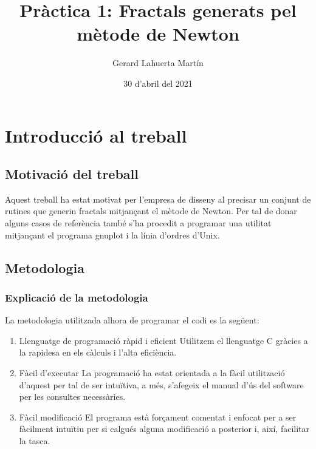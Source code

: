 \documentclass[12pt]{report}
\title{Pràctica 1: Fractals generats pel mètode de Newton}
\author{Gerard Lahuerta Martín}
\date{ 30 d'abril del 2021}
\begin{document}
\justifying
\maketitle


\newpage
\setcounter{page}{2}
\pagestyle{plain}
\tableofcontents
\cleardoublepage
{}


\newpage
\chapter{Introducció al treball}
\justifying
\section{Motivació del treball}
Aquest treball ha estat motivat per l'empresa de disseny al precisar un conjunt de rutines que generin fractals mitjançant el mètode de Newton. Per tal de donar alguns casos de referència també s'ha procedit a programar una utilitat mitjançant el programa gnuplot i la línia d'ordres d'Unix.


\section{Metodologia}
\subsection{Explicació de la metodologia}
La metodologia utilitzada alhora de programar el codi es la següent:
\begin{enumerate}
    \item Llenguatge de programació ràpid i eficient
    \newline
    Utilitzem el llenguatge C gràcies a la rapidesa en els càlculs i l'alta eficiència.
    \item Fàcil d'executar
    \newline
    La programació ha estat orientada a la fàcil utilització d'aquest per tal de ser intuïtiva, a més, s'afegeix el manual d'ús del software per les consultes necessàries.
    \item Fàcil modificació
    \newline
    El programa està forçament comentat i enfocat per a ser fàcilment intuïtiu per si calgués alguna modificació a posterior i, així, facilitar la tasca.
\end{enumerate}
\end{document}

